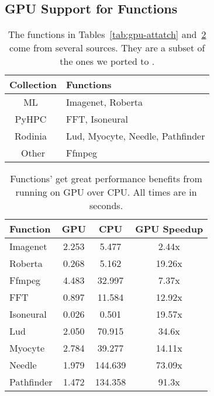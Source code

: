 \subsection{GPU Support for Functions}

\begin{table}
  \caption{The functions in Tables~\ref{tab:gpu-attatch} and~\ref{tab:gpu-cpu} come from several sources. 
  They are a subset of the ones we ported to \sysname.}
  \label{tab:fun-list}
  \vspace{\captionspace}
  \begin{tabular}{c|p{6cm}}
    \hline
    Collection & Functions \\
    \hline
    ML~\cite{kim2019functionbench} & Imagenet, Roberta \\ %
    PyHPC~\cite{pyhpc-bench} & FFT, Isoneural \\ %
    Rodinia~\cite{che2009rodinia} & Lud, Myocyte, Needle, Pathfinder \\ %
    Other & Ffmpeg \\
  \end{tabular}
  \vspace{-0.4cm}
\end{table}

\begin{table}
  \caption{Functions' get great performance benefits from running on GPU over CPU. All times are in seconds.}
  \label{tab:gpu-cpu}
  \vspace{\captionspace}
  \begin{tabular}{lccc}
    \hline
    Function & GPU & CPU & GPU Speedup \\
    \hline
  Imagenet & 2.253 & 5.477 & 2.44x \\
  Roberta & 0.268 & 5.162 & 19.26x \\
  Ffmpeg & 4.483 & 32.997 & 7.37x \\
  FFT & 0.897 & 11.584 & 12.92x \\
  Isoneural & 0.026 & 0.501 & 19.57x \\
  Lud & 2.050 & 70.915 & 34.6x \\
  Myocyte & 2.784 & 39.277 & 14.11x \\
  Needle & 1.979 & 144.639 & 73.09x \\
  Pathfinder & 1.472 & 134.358 & 91.3x \\
  \end{tabular}
  \vspace{-0.4cm}
\end{table}

